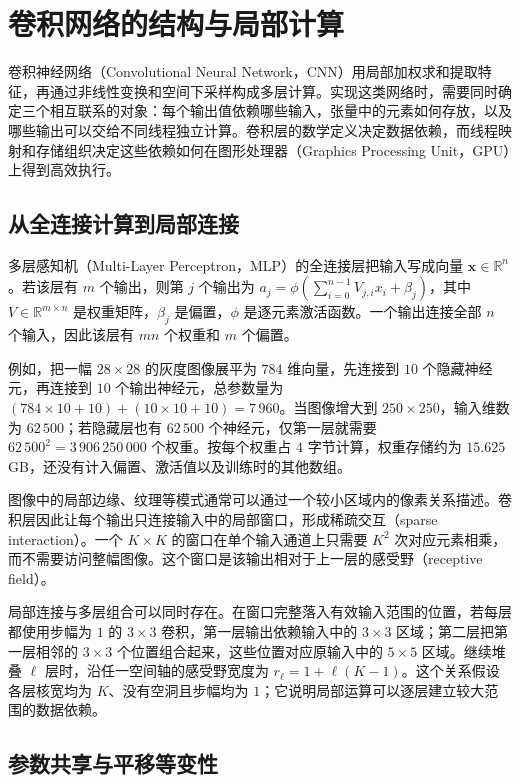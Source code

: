 \section{卷积网络的结构与局部计算}
\label{l11:sec:structure}

卷积神经网络（Convolutional Neural Network，CNN）用局部加权求和提取特征，再通过非线性变换和空间下采样构成多层计算。实现这类网络时，需要同时确定三个相互联系的对象：每个输出值依赖哪些输入，张量中的元素如何存放，以及哪些输出可以交给不同线程独立计算。卷积层的数学定义决定数据依赖，而线程映射和存储组织决定这些依赖如何在图形处理器（Graphics Processing Unit，GPU）上得到高效执行。

\subsection{从全连接计算到局部连接}

多层感知机（Multi-Layer Perceptron，MLP）的全连接层把输入写成向量 $\symbf{x}\in\mathbb{R}^n$。若该层有 $m$ 个输出，则第 $j$ 个输出为 $a_j=\phi(\sum_{i=0}^{n-1}V_{j,i}x_i+\beta_j)$，其中 $V\in\mathbb{R}^{m\times n}$ 是权重矩阵，$\beta_j$ 是偏置，$\phi$ 是逐元素激活函数。一个输出连接全部 $n$ 个输入，因此该层有 $mn$ 个权重和 $m$ 个偏置。

例如，把一幅 $28\times28$ 的灰度图像展平为 $784$ 维向量，先连接到 $10$ 个隐藏神经元，再连接到 $10$ 个输出神经元，总参数量为 $(784\times10+10)+(10\times10+10)=7\,960$。当图像增大到 $250\times250$，输入维数为 $62\,500$；若隐藏层也有 $62\,500$ 个神经元，仅第一层就需要 $62\,500^2=3\,906\,250\,000$ 个权重。按每个权重占 $4$ 字节计算，权重存储约为 $15.625$ GB，还没有计入偏置、激活值以及训练时的其他数组。

图像中的局部边缘、纹理等模式通常可以通过一个较小区域内的像素关系描述。卷积层因此让每个输出只连接输入中的局部窗口，形成稀疏交互（sparse interaction）。一个 $K\times K$ 的窗口在单个输入通道上只需要 $K^2$ 次对应元素相乘，而不需要访问整幅图像。这个窗口是该输出相对于上一层的感受野（receptive field）。

局部连接与多层组合可以同时存在。在窗口完整落入有效输入范围的位置，若每层都使用步幅为 $1$ 的 $3\times3$ 卷积，第一层输出依赖输入中的 $3\times3$ 区域；第二层把第一层相邻的 $3\times3$ 个位置组合起来，这些位置对应原输入中的 $5\times5$ 区域。继续堆叠 $\ell$ 层时，沿任一空间轴的感受野宽度为 $r_\ell=1+\ell(K-1)$。这个关系假设各层核宽均为 $K$、没有空洞且步幅均为 $1$；它说明局部运算可以逐层建立较大范围的数据依赖。

\subsection{参数共享与平移等变性}

